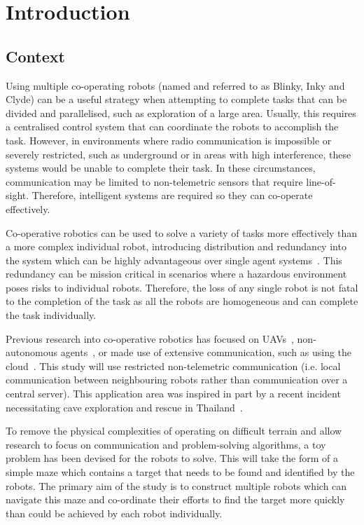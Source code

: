 
\chapter{Introduction}\label{introduction}
\section{Context}\label{introduction/context}
Using multiple co-operating robots (named and referred to as Blinky, Inky
and Clyde) can be a useful strategy when attempting to complete tasks that
can be divided and parallelised, such as exploration of a large area.
Usually, this requires a centralised control system that can
coordinate the robots to accomplish the task. However, in
environments where radio communication is impossible or severely restricted,
such as underground or in areas with high interference, these systems would
be unable to complete their task. In these circumstances, communication may
be limited to non-telemetric sensors that require line-of-sight. Therefore,
intelligent systems are required so they can co-operate effectively.

Co-operative robotics can be used to solve a variety of tasks more 
effectively than a more complex individual robot, introducing distribution
and redundancy into the system which can be highly advantageous over single 
agent systems~\cite{dudek96}. This redundancy can be mission critical in 
scenarios where a hazardous environment poses risks to individual robots. 
Therefore, the loss of any single robot is not fatal to the completion of the task as all
the robots are homogeneous and can complete the task individually.

Previous research into co-operative robotics has focused on UAVs~\cite{khan18},
non-autonomous agents~\cite{jimenez18}, or made use of extensive
communication, such as using the cloud~\cite{wensing2018cooperative}.
This study will use restricted non-telemetric communication (i.e. local 
communication between neighbouring robots rather than communication over a 
central server). This
application area was inspired in part by a recent incident necessitating cave 
exploration and rescue in Thailand~\cite{bbcthailand}.

To remove the physical complexities of operating on difficult
terrain and allow research to focus on communication and problem-solving 
algorithms, a toy problem has been devised for the robots to solve. This
will take the form of a simple maze which contains a target that needs to
be found and identified by the robots. The primary aim of the study is to
construct multiple robots which can navigate this maze and co-ordinate their
efforts to find the target more quickly than could be achieved by each robot 
individually.

